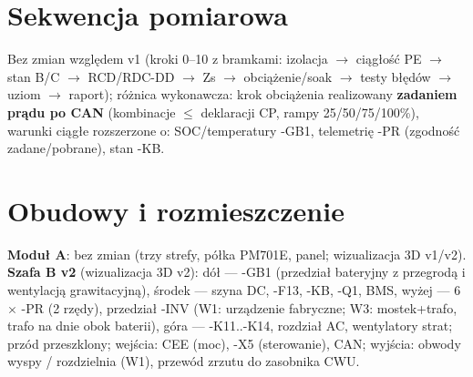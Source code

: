 \documentclass[11pt,a4paper]{article}
\begin{document}
\section{Sekwencja pomiarowa}
Bez zmian względem v1 (kroki 0--10 z bramkami: izolacja $\to$ ciągłość PE $\to$ stan B/C $\to$
RCD/RDC-DD $\to$ Zs $\to$ obciążenie/soak $\to$ testy błędów $\to$ uziom $\to$ raport); różnica
wykonawcza: krok obciążenia realizowany \textbf{zadaniem prądu po CAN} (kombinacje $\le$ deklaracji
CP, rampy 25/50/75/100\%), warunki ciągłe rozszerzone o: SOC/temperatury -GB1, telemetrię -PR
(zgodność zadane/pobrane), stan -KB.

\section{Obudowy i rozmieszczenie}
\textbf{Moduł A}: bez zmian (trzy strefy, półka PM701E, panel; wizualizacja 3D v1/v2).
\textbf{Szafa B v2} (wizualizacja 3D v2): dół --- -GB1 (przedział bateryjny z przegrodą
i wentylacją grawitacyjną), środek --- szyna DC, -F13, -KB, -Q1, BMS, wyżej --- 6$\times$ -PR
(2 rzędy), przedział -INV (W1: urządzenie fabryczne; W3: mostek+trafo, trafo na dnie obok baterii),
góra --- -K11..-K14, rozdział AC, wentylatory strat; przód przeszklony; wejścia: CEE (moc), -X5
(sterowanie), CAN; wyjścia: obwody wyspy / rozdzielnia (W1), przewód zrzutu do zasobnika CWU.
\end{document}
